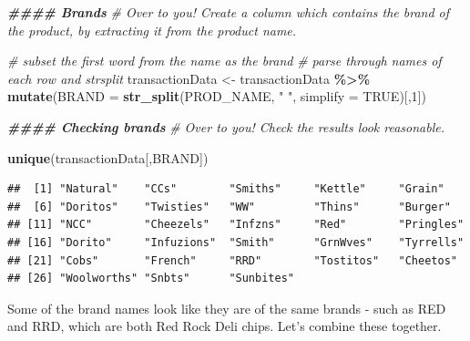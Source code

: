 \documentclass[
]{article}
\newenvironment{Shaded}{\begin{snugshade}}{\end{snugshade}}
\newcommand{\AttributeTok}[1]{\textcolor[rgb]{0.13,0.29,0.53}{#1}}
\newcommand{\CommentTok}[1]{\textcolor[rgb]{0.56,0.35,0.01}{\textit{#1}}}
\newcommand{\ConstantTok}[1]{\textcolor[rgb]{0.56,0.35,0.01}{#1}}
\newcommand{\DecValTok}[1]{\textcolor[rgb]{0.00,0.00,0.81}{#1}}
\newcommand{\DocumentationTok}[1]{\textcolor[rgb]{0.56,0.35,0.01}{\textbf{\textit{#1}}}}
\newcommand{\FunctionTok}[1]{\textcolor[rgb]{0.13,0.29,0.53}{\textbf{#1}}}
\newcommand{\NormalTok}[1]{#1}
\newcommand{\OtherTok}[1]{\textcolor[rgb]{0.56,0.35,0.01}{#1}}
\newcommand{\SpecialCharTok}[1]{\textcolor[rgb]{0.81,0.36,0.00}{\textbf{#1}}}
\newcommand{\StringTok}[1]{\textcolor[rgb]{0.31,0.60,0.02}{#1}}
\begin{document}
\begin{Shaded}
\begin{Highlighting}[]
\DocumentationTok{\#\#\#\# Brands}
\CommentTok{\# Over to you! Create a column which contains the brand of the product, by extracting it from the product name.}

\CommentTok{\# subset the first word from the name as the brand}
\CommentTok{\# parse through names of each row and strsplit}
\NormalTok{transactionData }\OtherTok{\textless{}{-}}\NormalTok{ transactionData }\SpecialCharTok{\%\textgreater{}\%} \FunctionTok{mutate}\NormalTok{(}\AttributeTok{BRAND =} \FunctionTok{str\_split}\NormalTok{(PROD\_NAME, }\StringTok{" "}\NormalTok{, }\AttributeTok{simplify =} \ConstantTok{TRUE}\NormalTok{)[,}\DecValTok{1}\NormalTok{])}

\DocumentationTok{\#\#\#\# Checking brands}
\CommentTok{\# Over to you! Check the results look reasonable.}

\FunctionTok{unique}\NormalTok{(transactionData[,BRAND])}
\end{Highlighting}
\end{Shaded}

\begin{verbatim}
##  [1] "Natural"    "CCs"        "Smiths"     "Kettle"     "Grain"     
##  [6] "Doritos"    "Twisties"   "WW"         "Thins"      "Burger"    
## [11] "NCC"        "Cheezels"   "Infzns"     "Red"        "Pringles"  
## [16] "Dorito"     "Infuzions"  "Smith"      "GrnWves"    "Tyrrells"  
## [21] "Cobs"       "French"     "RRD"        "Tostitos"   "Cheetos"   
## [26] "Woolworths" "Snbts"      "Sunbites"
\end{verbatim}

Some of the brand names look like they are of the same brands - such as
RED and RRD, which are both Red Rock Deli chips. Let's combine these
together.
\end{document}
